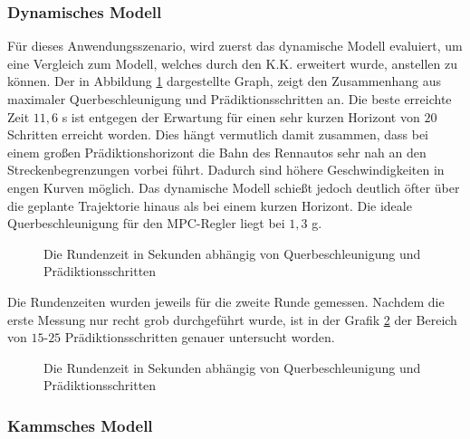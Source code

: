 \documentclass{like}
\begin{document}
\subsubsection{Dynamisches Modell}
Für dieses Anwendungsszenario, wird zuerst das dynamische Modell evaluiert, um eine Vergleich zum Modell, welches durch den \ac{K.K.} erweitert wurde, anstellen zu können.
Der in Abbildung \ref{fig:betaMaxN} dargestellte Graph, zeigt den Zusammenhang aus maximaler Querbeschleunigung und Prädiktionsschritten an. Die beste erreichte Zeit $11,6$ s ist entgegen der Erwartung für einen sehr kurzen Horizont von $20$ Schritten erreicht worden. Dies hängt vermutlich damit zusammen, dass bei einem großen Prädiktionshorizont die Bahn des Rennautos sehr nah an den Streckenbegrenzungen vorbei führt. Dadurch sind höhere Geschwindigkeiten in engen Kurven möglich. Das dynamische Modell schießt jedoch deutlich öfter über die geplante Trajektorie hinaus als bei einem kurzen Horizont. Die ideale Querbeschleunigung für den \ac{MPC}-Regler liegt bei $1,3$ g.  
\begin{figure}
	\centering
	 
	\caption{Die Rundenzeit in Sekunden abhängig von Querbeschleunigung und Prädiktionsschritten}
	\label{fig:betaMaxN}
\end{figure}


Die Rundenzeiten wurden jeweils für die zweite Runde gemessen.
Nachdem die erste Messung nur recht grob durchgeführt wurde, ist in der Grafik \ref{fig:betaMaxFine} der Bereich von $15$-$25$ Prädiktionsschritten genauer untersucht worden.

\begin{figure}
	\centering
	 
	\caption{Die Rundenzeit in Sekunden abhängig von Querbeschleunigung und Prädiktionsschritten}
	\label{fig:betaMaxFine}
\end{figure}

\subsubsection{Kammsches Modell}
\end{document}
